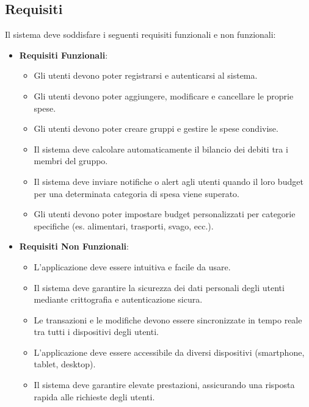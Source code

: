 \subsection{Requisiti}
Il sistema deve soddisfare i seguenti requisiti funzionali e non funzionali:

\begin{itemize}
    \item \textbf{Requisiti Funzionali}:
    \begin{itemize}
        \item Gli utenti devono poter registrarsi e autenticarsi al sistema.
        \item Gli utenti devono poter aggiungere, modificare e cancellare le proprie spese.
        \item Gli utenti devono poter creare gruppi e gestire le spese condivise.
        \item Il sistema deve calcolare automaticamente il bilancio dei debiti tra i membri del gruppo.
        \item Il sistema deve inviare notifiche o alert agli utenti quando il loro budget per una determinata categoria di spesa viene superato.
        \item Gli utenti devono poter impostare budget personalizzati per categorie specifiche (es. alimentari, trasporti, svago, ecc.).
    \end{itemize}
    
    \item \textbf{Requisiti Non Funzionali}:
    \begin{itemize}
        \item L'applicazione deve essere intuitiva e facile da usare.
        \item Il sistema deve garantire la sicurezza dei dati personali degli utenti mediante crittografia e autenticazione sicura.
        \item Le transazioni e le modifiche devono essere sincronizzate in tempo reale tra tutti i dispositivi degli utenti.
        \item L’applicazione deve essere accessibile da diversi dispositivi (smartphone, tablet, desktop).
        \item Il sistema deve garantire elevate prestazioni, assicurando una risposta rapida alle richieste degli utenti.
    \end{itemize}
\end{itemize}

